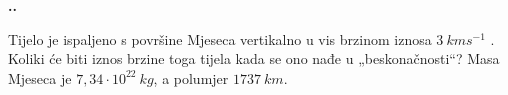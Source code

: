 

\noindent 
\textbf{
\thecjelina.\thezadatak.}

Tijelo je ispaljeno s površine Mjeseca vertikalno u vis brzinom iznosa $3\ kms^{-1}$ . Koliki će
biti iznos brzine toga tijela kada se ono nađe u „beskonačnosti“? Masa Mjeseca je $7,34 \cdot 10^{22}\ kg$, a polumjer $1737\ km$.



